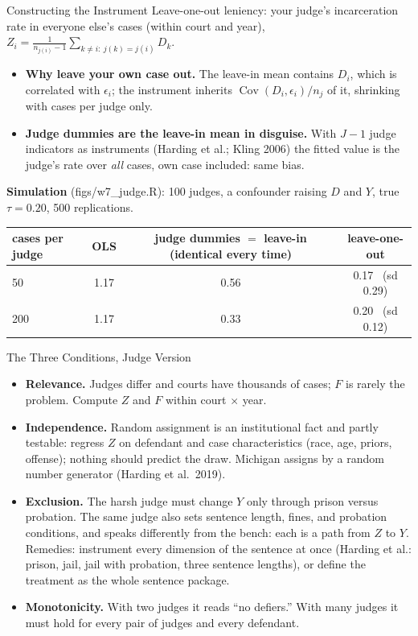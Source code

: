 \documentclass[aspectratio=169,11pt,xcolor=dvipsnames]{beamer}
\newcommand{\srcp}[1]{{\scriptsize\color{gray}(#1)}}
\DeclareMathOperator{\Cov}{Cov}
\begin{document}
\begin{frame}{Constructing the Instrument}
Leave-one-out leniency: your judge's incarceration rate in everyone else's
cases (within court and year), $Z_i = \frac{1}{n_{j(i)} - 1}\sum_{k \neq i:\ j(k) = j(i)} D_k$.
\begin{itemize}\itemsep0pt
  \item \textbf{Why leave your own case out.} The leave-in mean contains
        $D_i$, which is correlated with $\epsilon_i$; the instrument inherits
        $\Cov(D_i,\epsilon_i)/n_j$ of it, shrinking with cases per judge only.
  \item \textbf{Judge dummies are the leave-in mean in disguise.} With $J - 1$
        judge indicators as instruments (Harding et al.; Kling 2006) the fitted
        value is the judge's rate over \emph{all} cases, own case included: same bias.
\end{itemize}
\vskip1pt
\textbf{Simulation} \srcp{figs/w7\_judge.R}: 100 judges, a confounder raising
$D$ and $Y$, true $\tau = 0.20$, 500 replications.
\vskip-7pt
\begin{center}\small
\renewcommand{\arraystretch}{1.0}
\begin{tabular}{@{}lccc@{}}
\toprule
cases per judge & OLS & judge dummies $=$ leave-in (identical every time) & leave-one-out \\
\midrule
50  & 1.17 & 0.56 & 0.17 \ (sd 0.29) \\
200 & 1.17 & 0.33 & 0.20 \ (sd 0.12) \\
\bottomrule
\end{tabular}
\end{center}
\end{frame}

\begin{frame}{The Three Conditions, Judge Version}
\begin{itemize}\itemsep3pt
  \item \textbf{Relevance.} Judges differ and courts have thousands of cases;
        $F$ is rarely the problem. Compute $Z$ and $F$ within court $\times$ year.
  \item \textbf{Independence.} Random assignment is an institutional fact and
        partly testable: regress $Z$ on defendant and case characteristics
        (race, age, priors, offense); nothing should predict the draw.
        Michigan assigns by a random number generator \srcp{Harding et al.\ 2019}.
  \item \textbf{Exclusion.} The harsh judge must change $Y$ only through
        prison versus probation. The same judge also sets sentence length,
        fines, and probation conditions, and speaks differently from the
        bench: each is a path from $Z$ to $Y$. Remedies: instrument every
        dimension of the sentence at once (Harding et al.: prison, jail, jail
        with probation, three sentence lengths), or define the treatment as
        the whole sentence package.
  \item \textbf{Monotonicity.} With two judges it reads ``no defiers.'' With
        many judges it must hold for every pair of judges and every defendant.
\end{itemize}
\end{frame}
\end{document}
